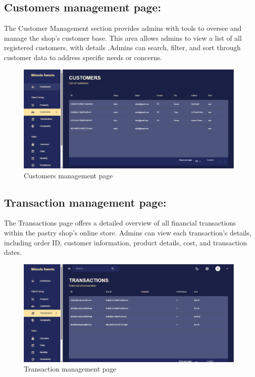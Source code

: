 \subsection{Customers management page:}

The Customer Management section provides admins with tools to oversee and manage the shop’s customer base. This area allows admins to view a list of all registered customers, with details .Admins can search, filter, and sort through customer data to address specific needs or concerns.

\begin{figure}[!h]
\begin{center}
\includegraphics{images/Customers management page.png}
\end{center}
\caption{Customers management page}
\end{figure}

\newpage
\subsection{Transaction management page:}

The Transactions page offers a detailed overview of all financial transactions within the pastry shop’s online store. Admins can view each transaction's details, including order ID, customer information, product details, cost, and transaction dates.

\begin{figure}[!h]
\begin{center}
\includegraphics{images/Transaction management page.png}
\end{center}
\caption{Transaction management page}
\end{figure}

